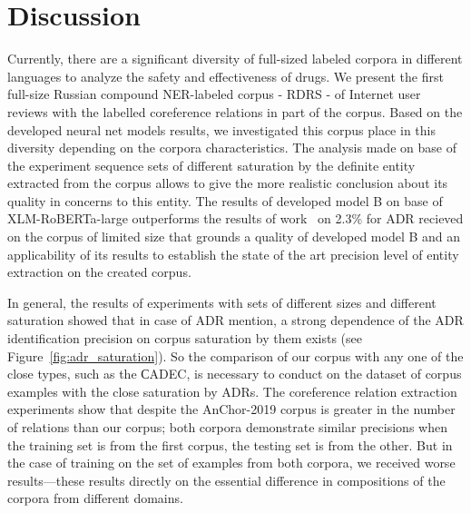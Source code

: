 \documentclass[a4paper,fleqn,longmktitle]{cas-dc}
\begin{document}
\section{Discussion}
\label{sec:discussion}
Currently, there are a significant diversity of full-sized labeled corpora in different languages to analyze the safety and effectiveness of drugs.  We present the first full-size Russian compound NER-labeled corpus - RDRS - of Internet user reviews with the  labelled coreference relations  in part of the corpus. Based on the developed neural net models results, we investigated this corpus place in this diversity depending on the corpora characteristics. The analysis made on base of the experiment sequence sets of different  saturation  by  the definite entity  extracted from the corpus allows to give the more realistic conclusion  about its quality in concerns to this entity. The results of developed model B on base of   XLM-RoBERTa-large outperforms the results of work~\cite{tutubalina2020russian} on 2.3\% for ADR recieved on the corpus of limited size that grounds  a quality of developed model B and an applicability of its results to  establish  the state of the art precision level of entity extraction on the created corpus. 

In general, the results of experiments with sets of different sizes and different saturation showed that  in case of ADR mention, a strong dependence  of the  ADR identification precision on corpus saturation  by them  exists (see Figure~\ref{fig:adr_saturation}). So the comparison of our corpus with any one of the close types, such as the СADEC, is necessary to conduct on the dataset of corpus examples with the close saturation by ADRs. The coreference relation extraction experiments show that despite the AnChor-2019 corpus is greater in the number of relations than our corpus; both corpora demonstrate similar precisions when the training set is from the first corpus, the testing set is from the other. But in the case of training on the set of examples from both corpora, we received worse results—these results directly on the essential difference in compositions of the corpora from different domains.
\end{document}
